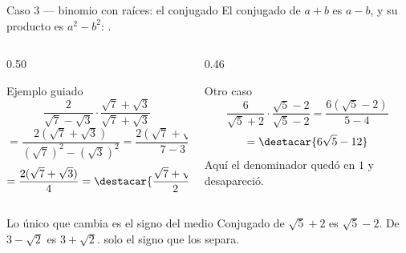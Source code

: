 \documentclass[aspectratio=169,10pt]{beamer}
\begin{document}
\begin{frame}{Caso 3 — binomio con raíces: el conjugado}
  \scriptsize
  {\tiny El conjugado de $a+b$ es $a-b$, y su producto es $a^{2}-b^{2}$:
  .}

  \vspace{0.08cm}
  \begin{columns}[T,onlytextwidth]
    \begin{column}{0.50\textwidth}
      \begin{exampleblock}{Ejemplo guiado}
        \tiny
        \[ \frac{2}{\sqrt{7}-\sqrt{3}}
           \cdot\frac{\sqrt{7}+\sqrt{3}}{\sqrt{7}+\sqrt{3}} \]
        \[ = \frac{2(\sqrt7+\sqrt3)}{(\sqrt7)^{2}-(\sqrt3)^{2}}
           = \frac{2(\sqrt7+\sqrt3)}{7-3} \]
        \[ = \frac{2(\sqrt7+\sqrt3)}{4}
           = \destacar{\frac{\sqrt{7}+\sqrt{3}}{2}} \]
      \end{exampleblock}
    \end{column}
    \begin{column}{0.46\textwidth}
      \begin{exampleblock}{Otro caso}
        \tiny
        \[ \frac{6}{\sqrt{5}+2}\cdot\frac{\sqrt5-2}{\sqrt5-2}
           = \frac{6(\sqrt5-2)}{5-4} \]
        \[ = \destacar{6\sqrt{5}-12} \]
        {\color{uniGris} Aquí el denominador quedó en $1$ y desapareció.}
      \end{exampleblock}
    \end{column}
  \end{columns}

  \vspace{0.05cm}
  \begin{alertblock}{Lo único que cambia es el signo del medio}
    \tiny
    Conjugado de $\sqrt5+2$ es $\sqrt5-2$. \quad De $3-\sqrt2$ es $3+\sqrt2$.
    solo el signo que los separa.
  \end{alertblock}
\end{frame}
\end{document}
